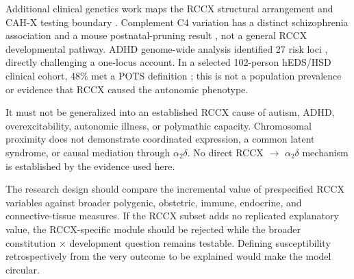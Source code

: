 Additional clinical genetics work maps the RCCX structural arrangement and CAH-X testing boundary \cite{ref22}. Complement C4 variation has a distinct schizophrenia association and a mouse postnatal-pruning result \cite{ref23}, not a general RCCX developmental pathway. ADHD genome-wide analysis identified 27 risk loci \cite{ref24}, directly challenging a one-locus account. In a selected 102-person hEDS/HSD clinical cohort, 48\% met a POTS definition \cite{ref33}; this is not a population prevalence or evidence that RCCX caused the autonomic phenotype.

It must not be generalized into an established RCCX cause of autism, ADHD, overexcitability, autonomic illness, or polymathic capacity. Chromosomal proximity does not demonstrate coordinated expression, a common latent syndrome, or causal mediation through \ensuremath{\alpha_2\delta}. No direct RCCX \ensuremath{\rightarrow} \ensuremath{\alpha_2\delta} mechanism is established by the evidence used here.

The research design should compare the incremental value of prespecified RCCX variables against broader polygenic, obstetric, immune, endocrine, and connective-tissue measures. If the RCCX subset adds no replicated explanatory value, the RCCX-specific module should be rejected while the broader constitution \ensuremath{\times} development question remains testable. Defining susceptibility retrospectively from the very outcome to be explained would make the model circular.
